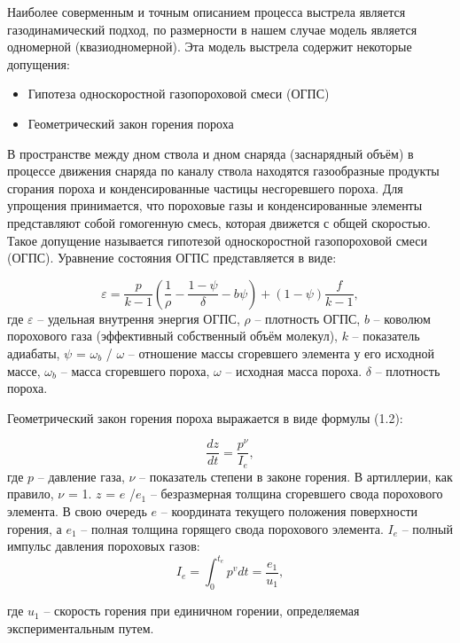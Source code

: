 \documentclass[14pt, a4paper]{report} %
\begin{document}
Наиболее соверменным и точным описанием процесса выстрела является газодинамический подход, 
по размерности в нашем случае модель является одномерной (квазиодномерной). Эта модель выстрела содержит некоторые допущения: 
\begin{itemize}
    \item Гипотеза односкоростной газопороховой смеси (ОГПС)
    \item Геометрический закон горения пороха
\end{itemize}


    В пространстве между дном ствола и дном снаряда (заснарядный объём) в процессе движения снаряда 
по каналу ствола находятся газообразные продукты сгорания пороха и конденсированные частицы несгоревшего пороха.
Для упрощения принимается, что пороховые газы и конденсированные элементы представляют собой гомогенную смесь, которая движется 
с общей скоростью. Такое допущение называется гипотезой односкоростной газопороховой смеси (ОГПС). Уравнение состояния ОГПС представляется в виде: 

\begin{equation}
\varepsilon = \frac{p}{k - 1} \left( \frac{1}{\rho} - \frac{1 - \psi}{\delta} - b \psi \right) + (1 - \psi) \frac{f}{k - 1},
\label{eq:epsilon}
\end{equation}
где $\varepsilon$ -- удельная внутрення энергия ОГПС, $\rho$ -- плотность ОГПС, $b$ -- коволюм порохового газа (эффективный собственный объём молекул), $k$ -- показатель адиабаты, 
$\psi$ = $\omega_b$ / $\omega$ -- отношение массы сгоревшего элемента у его исходной массе, $\omega_b$ -- масса сгоревшего пороха, $\omega$ -- исходная масса пороха. $\delta$ -- плотность пороха. 

Геометрический закон горения пороха выражается в виде формулы (1.2): 

\begin{equation}
\frac{dz}{dt} = \frac{p^\nu}{I_e}, 
\label{eq:1}
\end{equation}
где  $p$ -- давление газа, $\nu$ -- показатель степени
в законе горения. В артиллерии, как правило, $\nu$ = 1. $z$ = $e$ /$e_1$ -- безразмерная толщина сгоревшего свода порохового элемента. В свою очередь
$e$ -- координата текущего положения поверхности горения, а $e_1$ -- полная толщина горящего свода порохового элемента. $I_e$ -- полный импульс давления пороховых газов:
\[
I_e = \int_0^{t_e} p^v  dt = \frac{e_1}{u_1},
\]

где $u_1$ -- скорость горения при единичном горении, определяемая экспериментальным путем.
\end{document}
